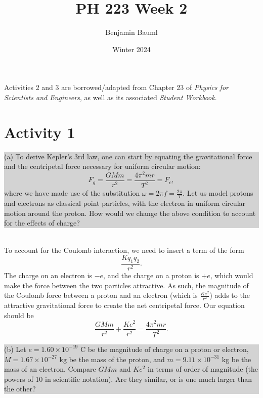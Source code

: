 \documentclass[]{article}
\title{PH 223 Week 2}
\author{Benjamin Bauml}
\date{Winter 2024}
\newcommand{\excerpt}[1]{\colorbox{lightgray}{\parbox{14.8cm}{#1}} \\}
\begin{document}
\maketitle

\begin{center}
	Activities 2 and 3 are borrowed/adapted from Chapter 23 of \textit{Physics for Scientists and Engineers}, as well as its associated \textit{Student Workbook}.

\end{center}
\section*{Activity 1}%
\excerpt{
(a) To derive Kepler's 3rd law, one can start by equating the gravitational force and the centripetal force necessary for uniform circular motion:
\[
F_{g} = \frac{GMm}{r^{2}} = \frac{4\pi^{2}mr}{T^{2}} = F_{c},
\]
where we have made use of the substitution $ \omega = 2\pi f = \frac{2\pi}{T} $. Let us model protons and electrons as classical point particles, with the electron in uniform circular motion around the proton. How would we change the above condition to account for the effects of charge?
}


To account for the Coulomb interaction, we need to insert a term of the form
\[
\frac{Kq_{1}q_{2}}{r^{2}}.
\]
The charge on an electron is $ -e $, and the charge on a proton is $ +e $, which would make the force between the two particles attractive. As such, the magnitude of the Coulomb force between a proton and an electron (which is $ \frac{Ke^{2}}{r^{2}} $) adds to the attractive gravitational force to create the net centripetal force. Our equation should be
\[
\frac{GMm}{r^{2}} + \frac{Ke^{2}}{r^{2}} = \frac{4\pi^{2}mr}{T^{2}}.
\]
\excerpt{
(b) Let $ e = 1.60\times10^{-19} $ C be the magnitude of charge on a proton or electron, $ M = 1.67\times10^{-27} $ kg be the mass of the proton, and $ m = 9.11\times10^{-31} $ kg be the mass of an electron. Compare $ GMm $ and $ Ke^{2} $ in terms of order of magnitude (the powers of 10 in scientific notation). Are they similar, or is one much larger than the other?
}
\end{document}

